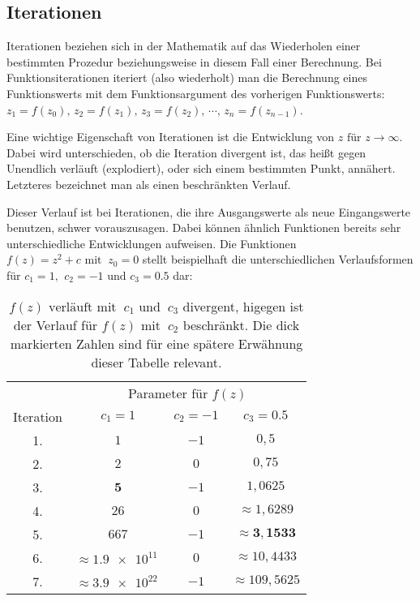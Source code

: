 \subsection{Iterationen}\label{subsec:iterations}

Iterationen beziehen sich in der Mathematik auf das Wiederholen einer bestimmten
Prozedur beziehungsweise in diesem Fall einer Berechnung.
Bei Funktionsiterationen iteriert (also wiederholt) man die Berechnung eines
Funktionswerts mit dem Funktionsargument des vorherigen Funktionswerts:
$z_1 = f(z_0),\, z_2 = f(z_1),\, z_3 = f(z_2),\, \cdots,\, z_n = f(z_{n-1})$.

Eine wichtige Eigenschaft von Iterationen ist die Entwicklung von
$z \text{ für } z \to \infty$.
Dabei wird unterschieden, ob die Iteration divergent ist,
das heißt gegen Unendlich verl\"auft (\glqq explodiert\grqq),
oder sich einem bestimmten Punkt, ann\"ahert.
Letzteres bezeichnet man als einen beschränkten Verlauf.

Dieser Verlauf ist bei Iterationen, die ihre Ausgangswerte als neue Eingangswerte
benutzen, schwer vorauszusagen.
Dabei k\"onnen \"ahnlich Funktionen bereits sehr unterschiedliche Entwicklungen aufweisen.
Die Funktionen $f(z) = z^2 + c \text{ mit }\ z_0 = 0$ stellt beispielhaft
die unterschiedlichen Verlaufsformen für
$c_1 = 1 \text{, }\ c_2 = -1 \text{ und } c_3 = 0.5$ dar:

\begin{table}[h!]
  \centering
  \begin{tabular}{@{}cccc@{}}
    \toprule
    & \multicolumn{3}{c}{Parameter für $f(z)$} \\
    \cmidrule(lr){2-4}
    Iteration & $ c_1 = 1$ & $ c_2 = -1$ & $ c_3 = 0.5$ \\
    \midrule
    1. & $1$ & $-1$ & $0,5$ \\
    2. & $2$ & $0$ & $0,75$ \\
    3. & $\boldsymbol{5}$ & $-1$ & $1,0625$ \\
    4. & $26$ & $0$ & $\approx 1,6289 $ \\
    5. & $667$ & $-1$ & $\approx \boldsymbol{3,1533} $ \\
    6. & $\approx \num{1,9e11}\ $ & $0$ & $\approx 10,4433 $ \\
    7. & $\approx \num{3,9e22}\ $ & $-1$ & $\approx 109,5625 $ \\
    \bottomrule
  \end{tabular}
  \caption{
    $f(z) \text{ verl\"auft mit }\ c_1 \text{ und }\ c_3$ divergent,
    higegen ist der Verlauf f\"ur $f(z) \text{ mit }\ c_2$ beschr\"ankt.
    Die dick markierten Zahlen sind für eine spätere Erwähnung dieser Tabelle
    relevant.
  }
  \label{tab:iterations-example}
\end{table}
